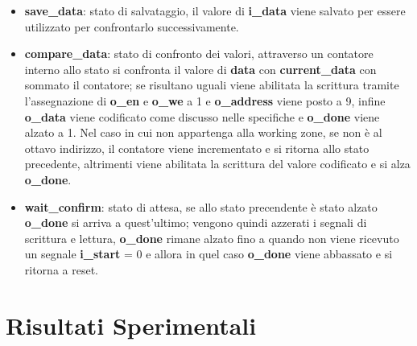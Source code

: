\documentclass[12pt]{article}
\begin{document}
\begin{itemize}
{          }
    \item \textbf{save\_data}: stato di salvataggio, il valore di \textbf{i\_data} viene salvato per essere utilizzato per confrontarlo successivamente.
    \item \textbf{compare\_data}: stato di confronto dei valori, attraverso un contatore interno allo stato si confronta il valore di \textbf{data} con \textbf{current\_data} con sommato il contatore; se risultano uguali viene abilitata la scrittura tramite l'assegnazione di \textbf{o\_en} e \textbf{o\_we} a 1 e \textbf{o\_address} viene posto a 9, infine \textbf{o\_data} viene codificato come discusso nelle specifiche e \textbf{o\_done} viene alzato a 1. Nel caso in cui non appartenga alla working zone, se non è al ottavo indirizzo, il contatore viene incrementato e si ritorna allo stato precedente, altrimenti viene abilitata la scrittura  del valore codificato  e si alza \textbf{o\_done}.
    \item \textbf{wait\_confirm}: stato di attesa, se allo stato precendente è stato alzato \textbf{o\_done} si arriva a quest'ultimo; vengono quindi azzerati i segnali di scrittura e lettura, \textbf{o\_done} rimane alzato fino a quando non viene ricevuto un segnale \textbf{i\_start} = 0 e allora in quel caso \textbf{o\_done} viene abbassato e si ritorna a reset.
\end{itemize}
\section{Risultati Sperimentali}
\end{document}
